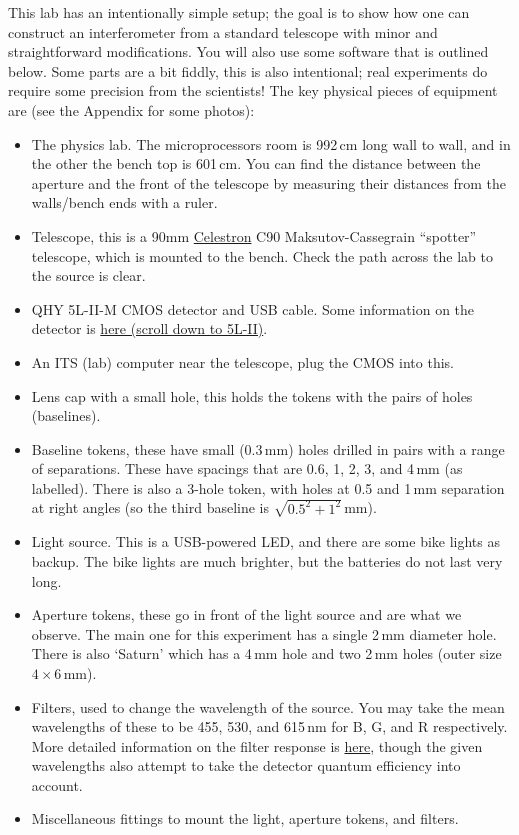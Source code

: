 \documentclass[11pt]{article}
\begin{document}
This lab has an intentionally simple setup; the goal is to show how one can construct an interferometer from a standard telescope with minor and straightforward modifications. You will also use some software that is outlined below. Some parts are a bit fiddly, this is also intentional; real experiments do require some precision from the scientists! The key physical pieces of equipment are (see the Appendix for some photos):
\begin{itemize}
    \item The physics lab. The microprocessors room is 992\,cm long wall to wall, and in the other the bench top is 601\,cm. You can find the distance between the aperture and the front of the telescope by measuring their distances from the walls/bench ends with a ruler.
    \item Telescope, this is a 90mm \href{https://www.celestron.com/products/c90-mak-spotting-scope#description}{Celestron} C90 Maksutov-Cassegrain ``spotter'' telescope, which is mounted to the bench. Check the path across the lab to the source is clear.
    \item QHY 5L-II-M CMOS detector and USB cable. Some information on the detector is \href{https://www.qhyccd.com/discontinued-products/}{here (scroll down to 5L-II)}.
    \item An ITS (lab) computer near the telescope, plug the CMOS into this.
    \item Lens cap with a small hole, this holds the tokens with the pairs of holes (baselines).
    \item Baseline tokens, these have small (0.3\,mm) holes drilled in pairs with a range of separations. These have spacings that are 0.6, 1, 2, 3, and 4\,mm (as labelled). There is also a 3-hole token, with holes at 0.5 and 1\,mm separation at right angles (so the third baseline is $\sqrt{0.5^2 + 1^2}$\,mm).
    \item Light source. This is a USB-powered LED, and there are some bike lights as backup. The bike lights are much brighter, but the batteries do not last very long.
    \item Aperture tokens, these go in front of the light source and are what we observe. The main one for this experiment has a single 2\,mm diameter hole. There is also `Saturn' which has a 4\,mm hole and two 2\,mm holes (outer size $4 \times 6$\,mm).
    \item Filters, used to change the wavelength of the source. You may take the mean wavelengths of these to be 455, 530, and 615\,nm for B, G, and R respectively. More detailed information on the filter response is \href{https://www.firstlightoptics.com/rgb-filters-filter-sets/zwo-2-lrgb-filter-set.html}{here}, though the given wavelengths also attempt to take the detector quantum efficiency into account.
    \item Miscellaneous fittings to mount the light, aperture tokens, and filters.
\end{itemize}
\end{document}
